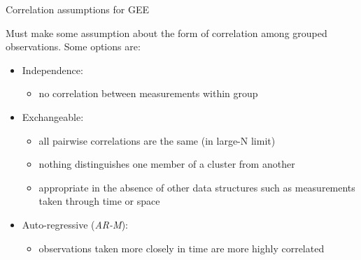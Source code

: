 \documentclass[
  ignorenonframetext,
]{beamer}
\providecommand{\tightlist}{%
  \setlength{\itemsep}{0pt}\setlength{\parskip}{0pt}}
\begin{document}
\begin{frame}{Correlation assumptions for GEE}
\protect\hypertarget{correlation-assumptions-for-gee}{}

Must make some assumption about the form of correlation among grouped
observations. Some options are:

\begin{itemize}
\tightlist
\item
  Independence:

  \begin{itemize}
  \tightlist
  \item
    no correlation between measurements within group
  \end{itemize}
\item
  Exchangeable:

  \begin{itemize}
  \tightlist
  \item
    all pairwise correlations are the same (in large-N limit)
  \item
    nothing distinguishes one member of a cluster from another
  \item
    appropriate in the absence of other data structures such as
    measurements taken through time or space
  \end{itemize}
\item
  Auto-regressive (\emph{AR-M}):

  \begin{itemize}
  \tightlist
  \item
    observations taken more closely in time are more highly correlated
  \end{itemize}
\end{itemize}

\end{frame}
\end{document}
